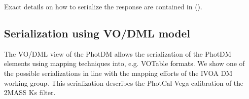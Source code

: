 \documentclass[11pt,a4paper]{ivoa}
\begin{document}
\begin{appendices}
\vspace{\baselineskip}
Exact details on how to serialize the response are contained in (\cite{derriere}).
\par

\subsection{Serialization using VO/DML model} \label{appendixmapping}
The VO/DML view of the PhotDM allows the serialization of the PhotDM elements using mapping techniques into, e.g. VOTable formats. We show one of the possible serializations in line with the mapping efforts of the IVOA DM working group. This serialization describes the PhotCal Vega calibration of the 2MASS Ks filter.



\end{appendices}


\end{document}

